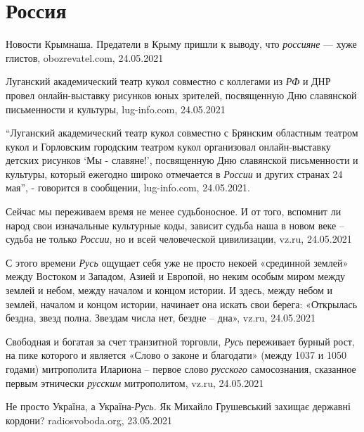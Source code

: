  
 
 
 
 
\chapter{Россия}

Новости Крымнаша. Предатели в Крыму пришли к выводу, что \emph{россияне} — хуже
глистов, obozrevatel.com, 24.05.2021

Луганский академический театр кукол совместно с коллегами из \emph{РФ} и ДНР
провел онлайн-выставку рисунков юных зрителей, посвященную Дню славянской
письменности и культуры, lug-info.com, 24.05.2021

\enquote{Луганский академический театр кукол совместно с Брянским областным
театром кукол и Горловским городским театром кукол организовал онлайн-выставку
детских рисунков \enquote{Мы - славяне!}, посвященную Дню славянской
письменности и культуры, который ежегодно широко отмечается в \emph{России} и
других странах 24 мая}, - говорится в сообщении, lug-info.com, 24.05.2021.

Сейчас мы переживаем время не менее судьбоносное. И от того, вспомнит ли народ
свои изначальные культурные коды, зависит судьба наша в новом веке – судьба не
только \emph{России}, но и всей человеческой цивилизации, vz.ru, 24.05.2021

С этого времени \emph{Русь} ощущает себя уже не просто некоей «срединной
землей» между Востоком и Западом, Азией и Европой, но неким особым миром между
землей и небом, между началом и концом истории. И здесь, между небом и землей,
началом и концом истории, начинает она искать свои берега: «Открылась бездна,
звезд полна. Звездам числа нет, бездне – дна», vz.ru, 24.05.2021

Свободная и богатая за счет транзитной торговли, \emph{Русь} переживает бурный
рост, на пике которого и является «Слово о законе и благодати» (между 1037 и
1050 годами) митрополита Илариона – первое слово \emph{русского} самосознания,
сказанное первым этнически \emph{русским} митрополитом, vz.ru, 24.05.2021

Не просто Україна, а Україна-\emph{Русь}. Як Михайло Грушевський захищає
державні кордони?  radiosvoboda.org, 23.05.2021

